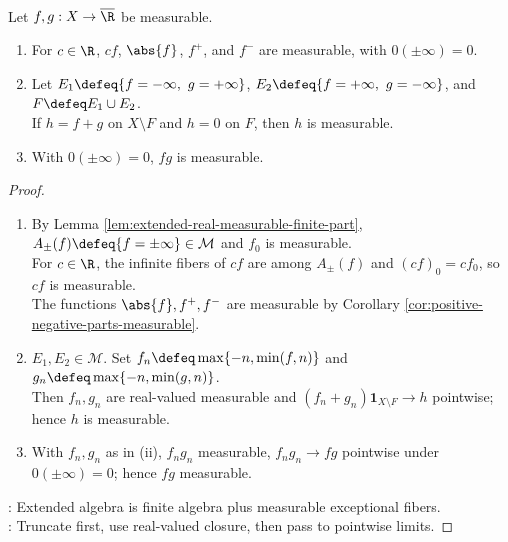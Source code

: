 \begin{corollary} \label{cor:extended-measurable-algebra-conventions} \\
Let $f,g:X\to\overline{\R}$ be measurable.
\begin{enumerate}[label=(\roman*)]
\setlength{\itemsep}{0pt}
\item For $c\in\R$, $cf$, $\abs{f}$, $f^+$, and $f^-$ are measurable, with $0(\pm\infty)=0$.
\item Let $E_1\defeq\{f=-\infty,\ g=+\infty\}$, $E_2\defeq\{f=+\infty,\ g=-\infty\}$, and $F\defeq E_1\cup E_2$.\\
If $h=f+g$ on $X\setminus F$ and $h=0$ on $F$, then $h$ is measurable.
\item With $0(\pm\infty)=0$, $fg$ is measurable.
\end{enumerate}
\begin{proof}
\begin{enumerate}[label=(\roman*)]
\setlength{\itemsep}{0pt}
\item By Lemma \ref{lem:extended-real-measurable-finite-part}, $A_\pm(f)\defeq\{f=\pm\infty\}\in\mathcal{M}$ and $f_0$ is measurable.\\
For $c\in\R$, the infinite fibers of $cf$ are among $A_\pm(f)$ and $(cf)_0=cf_0$, so $cf$ is measurable.\\
The functions $\abs{f},f^+,f^-$ are measurable by Corollary \ref{cor:positive-negative-parts-measurable}.
\item $E_1,E_2\in\mathcal{M}$. Set $f_n\defeq\max\{-n,\min(f,n)\}$ and $g_n\defeq\max\{-n,\min(g,n)\}$.\\
Then $f_n,g_n$ are real-valued measurable and $(f_n+g_n)\mathbf{1}_{X\setminus F}\to h$ pointwise; hence $h$ is measurable.
\item With $f_n,g_n$ as in (ii), $f_ng_n$ measurable, $f_ng_n\to fg$ pointwise under $0(\pm\infty)=0$; hence $fg$ measurable.
\end{enumerate}
: Extended algebra is finite algebra plus measurable exceptional fibers.\\
: Truncate first, use real-valued closure, then pass to pointwise limits.
\end{proof}
\end{corollary}


